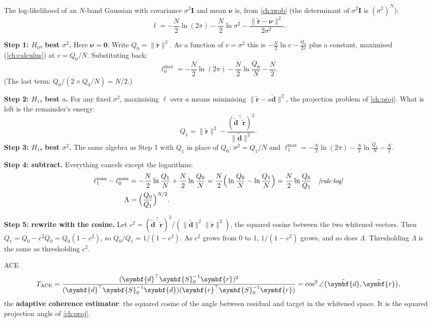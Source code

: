 \documentclass[11pt,a4paper,oneside,openany]{book}
\newcommand{\B}[1]{{\symbf{#1}}}
\newcommand{\B}[1]{{\bm{#1}}}
\newcommand{\T}{^{\top}}
\newcommand{\nrm}[1]{\lVert #1\rVert}
\newcommand{\vr}{\B{r}}
\newcommand{\vd}{\B{d}}
\newcommand{\mS}{\B{S}}
\newcommand{\mI}{\B{I}}
\newcommand{\why}[1]{&&\text{\small\itshape #1}}
\begin{document}
The log-likelihood of an $N$-band Gaussian with covariance $\sigma^2\mI$ and mean $\B\nu$ is, from \cref{ch:prob} (the determinant of $\sigma^2\mI$ is
$(\sigma^2)^N$):
\[
  \ell=-\frac N2\ln(2\pi)-\frac N2\ln\sigma^2-\frac{\nrm{\tilde{\vr}-\B\nu}^2}{2\sigma^2}.
\]

\textbf{Step 1: $H_0$, best $\sigma^2$.} Here $\B\nu=\B0$. Write $Q_0=\nrm{\tilde{\vr}}^2$. As a function of $v=\sigma^2$ this is
$-\frac N2\ln v-\frac{Q_0}{2v}$ plus a constant, maximised (\cref{ch:calculus}) at $v=Q_0/N$. Substituting back:
\[
  \ell_0^{\max}=-\frac N2\ln(2\pi)-\frac N2\ln\frac{Q_0}{N}-\frac N2 .
\]
(The last term: $Q_0/(2\times Q_0/N)=N/2$.)

\textbf{Step 2: $H_1$, best $a$.} For any fixed $\sigma^2$, maximising $\ell$ over $a$ means minimising $\nrm{\tilde{\vr}-a\tilde{\vd}}^2$, the projection
problem of \cref{ch:proj}. What is left is the remainder's energy:
\[
  Q_1=\nrm{\tilde{\vr}}^2-\frac{(\tilde{\vd}\T\tilde{\vr})^2}{\nrm{\tilde{\vd}}^2} .
\]
\textbf{Step 3: $H_1$, best $\sigma^2$.} The same algebra as Step 1 with $Q_1$ in place of $Q_0$: $\sigma^2=Q_1/N$ and
$\ell_1^{\max}=-\frac N2\ln(2\pi)-\frac N2\ln\frac{Q_1}{N}-\frac N2$.

\textbf{Step 4: subtract.} Everything cancels except the logarithms:
\begin{align*}
\ell_1^{\max}-\ell_0^{\max} &= -\frac N2\ln\frac{Q_1}N+\frac N2\ln\frac{Q_0}N
 =\frac N2\Big(\ln\frac{Q_0}N-\ln\frac{Q_1}N\Big)=\frac N2\ln\frac{Q_0}{Q_1} \why{\cref{rule:log}}\\
\Lambda &= \Big(\frac{Q_0}{Q_1}\Big)^{N/2} .
\end{align*}

\textbf{Step 5: rewrite with the cosine.} Let $c^2=(\tilde{\vd}\T\tilde{\vr})^2/(\nrm{\tilde{\vd}}^2\nrm{\tilde{\vr}}^2)$, the squared cosine between the two whitened
vectors. Then $Q_1=Q_0-c^2Q_0=Q_0(1-c^2)$, so $Q_0/Q_1=1/(1-c^2)$. As $c^2$ grows from 0 to 1, $1/(1-c^2)$ grows, and so does $\Lambda$. Thresholding
$\Lambda$ is the same as thresholding $c^2$.

\begin{rulebox}[label=rule:ace]{ACE}
\[
  T_{\rm ACE}=\frac{(\vd\T\mS_0^{-1}\vr)^2}{(\vd\T\mS_0^{-1}\vd)(\vr\T\mS_0^{-1}\vr)}=\cos^2\angle\big(\tilde{\vd},\tilde{\vr}\big),
\]
the \textbf{adaptive coherence estimator}: the squared cosine of the angle between residual and target in the whitened space. It is the squared
projection angle of \cref{ch:proj}.
\end{rulebox}
\end{document}
